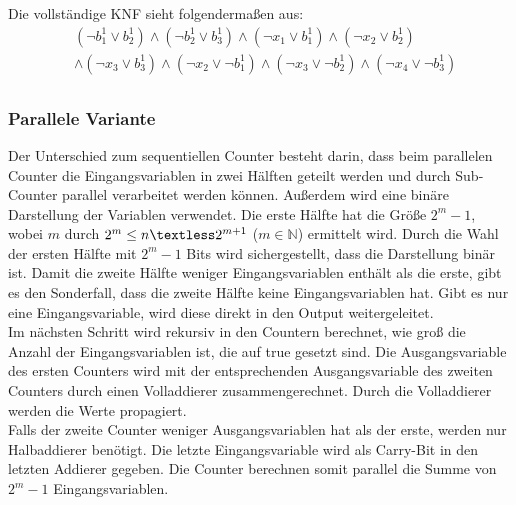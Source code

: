 \documentclass[a4,abstract=on]{scrartcl}
\begin{document}
Die vollständige KNF sieht folgendermaßen aus:\\
\begin{align*}
&(\neg b_1^1 \vee b_2^1) \wedge (\neg b_2^1 \vee b_3^1) \wedge (\neg x_1 \vee b_1^1) \wedge (\neg x_2 \vee b_2^1)\\ &\wedge (\neg x_3 \vee b_3^1) \wedge (\neg x_2 \vee \neg b_1^1) \wedge (\neg x_3 \vee \neg b_2^1) \wedge (\neg x_4 \vee \neg b_3^1) \\
\end{align*}

		\subsubsection{Parallele Variante}
Der Unterschied zum sequentiellen Counter besteht darin, dass beim parallelen Counter die Eingangsvariablen in zwei Hälften geteilt werden und durch Sub-Counter parallel verarbeitet werden können. Außerdem wird eine binäre Darstellung der Variablen verwendet. Die erste Hälfte hat die Größe $2^{m}-1$, wobei $m$ durch $2^m \leq n \textless 2^{m+1}$ ($m \in \mathbb{N}$) ermittelt wird. Durch die Wahl der ersten Hälfte mit $2^{m}-1$ Bits wird sichergestellt, dass die Darstellung binär ist. Damit die zweite Hälfte weniger Eingangsvariablen enthält als die erste, gibt es den Sonderfall, dass die zweite Hälfte keine Eingangsvariablen hat. Gibt es nur eine Eingangsvariable, wird diese direkt in den Output weitergeleitet.\\
Im nächsten Schritt wird rekursiv in den Countern berechnet, wie groß die Anzahl der Eingangsvariablen ist, die auf true gesetzt sind. Die Ausgangsvariable des ersten Counters wird mit der entsprechenden Ausgangsvariable des zweiten Counters durch einen Volladdierer zusammengerechnet. Durch die Volladdierer werden die Werte propagiert.\\
Falls der zweite Counter weniger Ausgangsvariablen hat als der erste, werden nur Halbaddierer benötigt. Die letzte Eingangsvariable wird als Carry-Bit in den letzten Addierer gegeben. Die Counter berechnen somit parallel die Summe von $2^m-1$ Eingangsvariablen.\\
\end{document}
